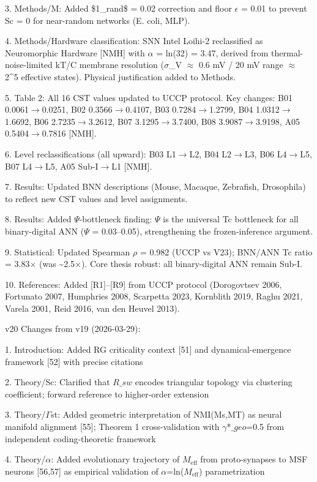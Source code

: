 \documentclass[a4paper,12pt]{article}
\begin{document}
3. Methods/M: Added \$1_{rand}\$ = 0.02 correction and floor $\epsilon$ = 0.01 to prevent Sc = 0 for near-random networks (E. coli, MLP).

4. Methods/Hardware classification: SNN Intel Loihi-2 reclassified as Neuromorphic Hardware [NMH] with $\alpha$ = ln(32) = 3.47, derived from thermal-noise-limited kT/C membrane resolution ($\sigma$_V $\approx$ 0.6 mV / 20 mV range $\approx$ 2^5 effective states). Physical justification added to Methods.

5. Table 2: All 16 CST values updated to UCCP protocol. Key changes: B01 0.0061$\rightarrow$0.0251, B02 0.3566$\rightarrow$0.4107, B03 0.7284$\rightarrow$1.2799, B04 1.0312$\rightarrow$1.6692, B06 2.7235$\rightarrow$3.2612, B07 3.1295$\rightarrow$3.7400, B08 3.9087$\rightarrow$3.9198, A05 0.5404$\rightarrow$0.7816 [NMH].

6. Level reclassifications (all upward): B03 L1$\rightarrow$L2, B04 L2$\rightarrow$L3, B06 L4$\rightarrow$L5, B07 L4$\rightarrow$L5, A05 Sub-I$\rightarrow$L1 [NMH].

7. Results: Updated BNN descriptions (Mouse, Macaque, Zebrafish, Drosophila) to reflect new CST values and level assignments.

8. Results: Added $\Psi$-bottleneck finding: $\Psi$ is the universal Tc bottleneck for all binary-digital ANN ($\Psi$ = 0.03--0.05), strengthening the frozen-inference argument.

9. Statistical: Updated Spearman $\rho$ = 0.982 (UCCP vs V23); BNN/ANN Tc ratio = 3.83$\times$ (was \textasciitilde{}2.5$\times$). Core thesis robust: all binary-digital ANN remain Sub-I.

10. References: Added [R1]--[R9] from UCCP protocol (Dorogovtsev 2006, Fortunato 2007, Humphries 2008, Scarpetta 2023, Kornblith 2019, Raghu 2021, Varela 2001, Reid 2016, van den Heuvel 2013).

v20 Changes from v19 (2026-03-29):

1. Introduction: Added RG criticality context [51] and dynamical-emergence framework [52] with precise citations

2. Theory/Sc: Clarified that $R\_{sw}$ encodes triangular topology via clustering coefficient; forward reference to higher-order extension

3. Theory/$\Gamma$st: Added geometric interpretation of NMI(Ms,MT) as neural manifold alignment [55]; Theorem 1 cross-validation with $\gamma$*$\_geo$=0.5 from independent coding-theoretic framework

4. Theory/$\alpha$: Added evolutionary trajectory of $M_{\text{eff}}$ from proto-synapses to MSF neurons [56,57] as empirical validation of $\alpha$=ln($M_{\text{eff}}$) parametrization
\end{document}
